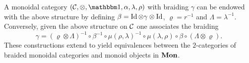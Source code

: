 
A monoidal category $(\CCC, \otimes,\monunit, \alpha,\lambda, \rho)$ with braiding $\gamma$ can be endowed with the above structure by defining $\beta = \operatorname{Id}\otimes \gamma \otimes \operatorname{Id}$, $\varrho = r^{-1}$ and $\Lambda = \lambda^{-1}$. Conversely, given the above structure on $\mathcal{C}$ one associates the braiding 
\begin{equation}
\label{ExtractBraiding}
\gamma = (\varrho \otimes \Lambda)^{-1} \circ \beta^{-1} \circ \mu(\rho,\lambda)^{-1} \circ \mu(\lambda,\rho) \circ \beta \circ (\Lambda \otimes \varrho). 
\end{equation}
These constructions extend to yield equivalences between the $2$-categories of braided monoidal categories and monoid objects in $\mathbf{Mon}$.



